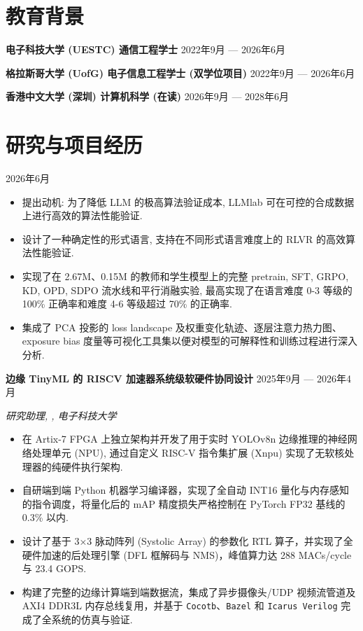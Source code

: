\section{教育背景}

\textbf{电子科技大学 (UESTC) 通信工程学士} \hfill 2022年9月 --- 2026年6月

\textbf{格拉斯哥大学 (UofG) 电子信息工程学士 (双学位项目)} \hfill 2022年9月 --- 2026年6月

\textbf{香港中文大学 (深圳) 计算机科学 (在读)} \hfill 2026年9月 --- 2028年6月


\section{研究与项目经历}

 \hfill 2026年6月

\begin{itemize}
    \item 提出动机: 为了降低 LLM 的极高算法验证成本, LLMlab 可在可控的合成数据上进行高效的算法性能验证.
    \item 设计了一种确定性的形式语言, 支持在不同形式语言难度上的 RLVR 的高效算法性能验证.
    \item 实现了在 2.67M、0.15M 的教师和学生模型上的完整 pretrain, SFT, GRPO, KD, OPD, SDPO 流水线和平行消融实验, 最高实现了在语言难度 0-3 等级的 100\% 正确率和难度 4-6 等级超过 70\% 的正确率.
    \item 集成了 PCA 投影的 loss landscape 及权重变化轨迹、逐层注意力热力图、exposure bias 度量等可视化工具集以便对模型的可解释性和训练过程进行深入分析.
\end{itemize}

\textbf{边缘 TinyML 的 RISCV 加速器系统级软硬件协同设计} \hfill 2025年9月 --- 2026年4月

\vspace{-0.2em} \begin{small} \textit{研究助理, , 电子科技大学} \end{small} \vspace{-0.2em}

\begin{itemize}
    \item 在 Artix-7 FPGA 上独立架构并开发了用于实时 YOLOv8n 边缘推理的神经网络处理单元 (NPU), 通过自定义 RISC-V 指令集扩展 (Xnpu) 实现了无软核处理器的纯硬件执行架构.
    \item 自研端到端 Python 机器学习编译器，实现了全自动 INT16 量化与内存感知的指令调度，将量化后的 mAP 精度损失严格控制在 PyTorch FP32 基线的 0.3\% 以内.
    \item 设计了基于 3×3 脉动阵列 (Systolic Array) 的参数化 RTL 算子，并实现了全硬件加速的后处理引擎 (DFL 框解码与 NMS)，峰值算力达 288 MACs/cycle 与 23.4 GOPS.
    \item 构建了完整的边缘计算端到端数据流，集成了异步摄像头/UDP 视频流管道及 AXI4 DDR3L 内存总线复用，并基于 \texttt{Cocotb}、\texttt{Bazel} 和 \texttt{Icarus Verilog} 完成了全系统的仿真与验证.
\end{itemize}

